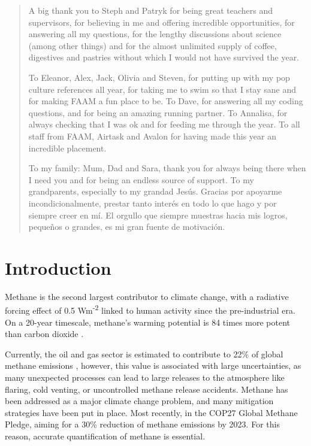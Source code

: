 \documentclass[12pt]{article}
\begin{document}
\renewcommand{\abstractname}{Acknowledgements}
\newpage\begin{abstract}
A big thank you to Steph and Patryk for being great teachers and supervisors, for believing in me and offering incredible opportunities, for answering all my questions, for the lengthy discussions about science (among other things) and for the almost unlimited supply of coffee, digestives and pastries without which I would not have survived the year. 

To Eleanor, Alex, Jack, Olivia and Steven, for putting up with my pop culture references all year, for taking me to swim so that I stay sane and for making FAAM a fun place to be. To Dave, for answering  all my coding questions, and for being an amazing running partner. To Annalisa, for always checking that I was ok and for feeding me through the year. To all staff from FAAM,  Airtask and Avalon for having made this year an incredible placement. 

  To my family: Mum, Dad and Sara, thank you for always being there when I need you and for being an endless source of support. To my grandparents, especially to my grandad Jesús. Gracias por apoyarme incondicionalmente, prestar tanto interés en todo lo que hago y por siempre creer en mí. El orgullo que siempre muestras hacia mis logros, pequeños o grandes, es mi gran fuente de motivación.


\end{abstract}

\newpage\section{Introduction}\label{intro}
Methane is the second largest contributor to climate change,  with a radiative forcing effect of 0.5 Wm\textsuperscript{-2} \parencite{Prather2001AtmosphericGases} linked to human activity since the pre-industrial era. On a 20-year timescale, methane’s warming potential is 84 times more potent than carbon dioxide \parencite{Myhre2013AnthropogenicForcing}.   

Currently, the oil and gas sector is estimated to contribute to 22\% of global methane emissions \parencite{Saunois2020The20002017}, however, this value is associated with large uncertainties, as many unexpected processes can lead to large releases to the atmosphere like flaring, cold venting, or uncontrolled methane release accidents. Methane has been addressed as a major climate change problem, and many mitigation strategies have been put in place. Most recently, in the COP27 Global Methane Pledge, aiming for a 30\% reduction of methane emissions by 2023\parencite{IEA2022Global2022}. For this reason, accurate quantification of methane is essential. 
\end{document}
